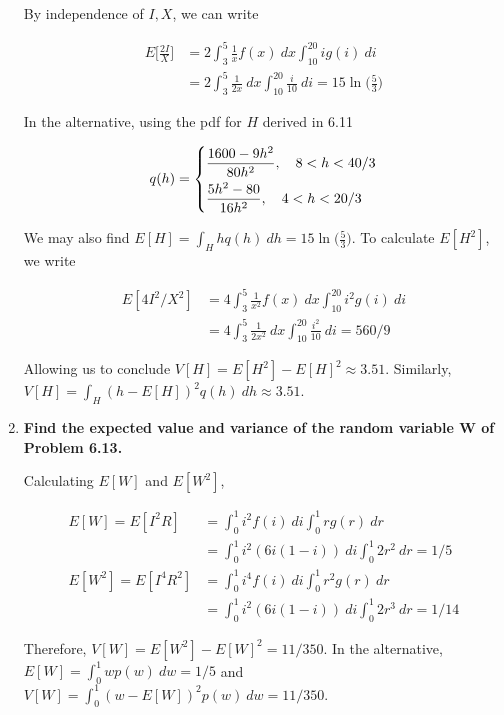 \documentclass[10pt, oneside]{article}   	%
\theoremstyle{definition}
\begin{document}
\begin{enumerate}[label=7.\arabic*]
  By independence of $I, X$, we can write
  
  \begin{align*}
  E \Big[ \frac{2I}{X} \Big] &= 2 \int^5_3 \frac{1}{x} f(x) \ dx \int^{20}_{10} i g(i) \ di \\
  &= 2 \int^5_3 \frac{1}{2x} \ dx \int^{20}_{10} \frac{i}{10} \ di = \boxed{15 \ln \Big( \frac{5}{3} \Big)}
  \end{align*}
  
  In the alternative, using the pdf for $H$ derived in 6.11
  
  \[ q(h) =
\begin{dcases}
 \frac{1600-9h^2}{80h^2}, \quad 8 < h < 40/3  \\
 \frac{5h^2 - 80}{16 h^2}, \quad 4 < h < 20/3 
\end{dcases}
\]

We may also find $E[H] = \int_H h q(h) \ dh = \boxed{15 \ln \Big( \frac{5}{3} \Big)}$. To calculate $E[H^2]$, we write

\begin{align*}
E[4I^2 / X^2] &= 4 \int^5_3 \frac{1}{x^2} f(x) \ dx \int^{20}_{10} i^2 g(i) \ di \\
&= 4 \int^5_3 \frac{1}{2x^2} \ dx \int^{20}_{10} \frac{i^2}{10} \ di = 560/9
\end{align*}

Allowing us to conclude $V[H] = E[H^2] - E[H]^2 \approx \boxed{3.51}$. Similarly, $V[H] = \int_H (h - E[H])^2 q(h) \ dh \approx \boxed{3.51}$.
  
\item  \begin{tcolorbox}[
  colback=Cerulean!5!white,
  colframe=Cerulean!75!black]
  \textbf{Find the expected value and variance of the random variable $\bm{W}$ of Problem 6.13.}
  \end{tcolorbox}
  
  Calculating $E[W]$ and $E[W^2]$,
  
  \begin{align*}
  E[W] = E[I^2 R] &= \int^1_0 i^2 f(i) \ di \int^1_0 r g(r) \ dr \\
  &= \int^1_0 i^2 (6i(1-i)) \ di \int^1_0 2r^2 \ dr = \boxed{1/5} \\
  E[W^2] = E[I^4 R^2] &= \int^1_0 i^4 f(i) \ di \int^1_0 r^2 g(r) \ dr \\
  &= \int^1_0 i^2 (6i(1-i)) \ di \int^1_0 2r^3 \ dr = 1/14
  \end{align*}
  
  Therefore, $V[W] = E[W^2] - E[W]^2 = \boxed{11/350}$. In the alternative, $E[W] = \int^1_0 w p(w) \ dw = \boxed{1/5}$ and $V[W] = \int^1_0 (w - E[W])^2 p(w) \ dw = \boxed{11/350}$.


\end{enumerate}
\end{document}
